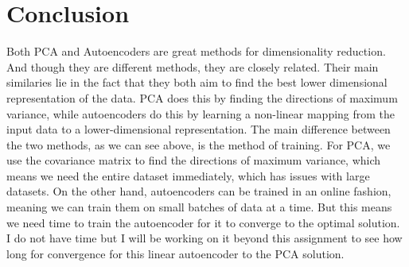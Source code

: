 \documentclass[answers,12pt,addpoints]{exam}
\begin{document}
\section{Conclusion}
Both PCA and Autoencoders are great methods for dimensionality reduction. And though they are different methods, they are closely related. Their main similaries lie in the fact that they both aim to find the best lower dimensional representation of the data. PCA does this by finding the directions of maximum variance, while autoencoders do this by learning a non-linear mapping from the input data to a lower-dimensional representation. The main difference between the two methods, as we can see above, is the method of training. For PCA, we use the covariance matrix to find the directions of maximum variance, which means we need the entire dataset immediately, which has issues with large datasets. On the other hand, autoencoders can be trained in an online fashion, meaning we can train them on small batches of data at a time. But this means we need time to train the autoencoder for it to converge to the optimal solution.\\
I do not have time but I will be working on it beyond this assignment to see how long for convergence for this linear autoencoder to the PCA solution. 
\end{document}
